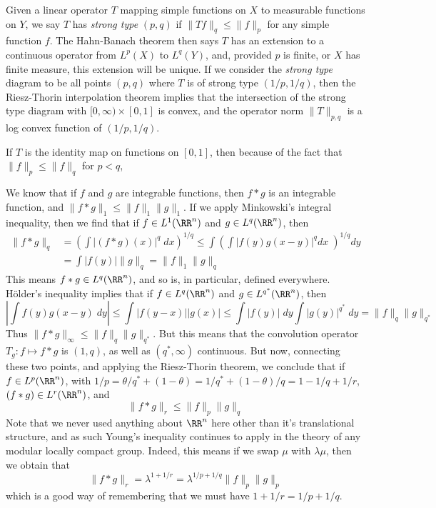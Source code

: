 Given a linear operator $T$ mapping simple functions on $X$ to measurable functions on $Y$, we say $T$ has {\it strong type} $(p,q)$ if $\| T f \|_q \leq \| f \|_p$ for any simple function $f$. The Hahn-Banach theorem then says $T$ has an extension to a continuous operator from $L^p(X)$ to $L^q(Y)$, and, provided $p$ is finite, or $X$ has finite measure, this extension will be unique. If we consider the {\it strong type} diagram to be all points $(p,q)$ where $T$ is of strong type $(1/p,1/q)$, then the Riesz-Thorin interpolation theorem implies that the intersection of the strong type diagram with $[0,\infty) \times [0,1]$ is convex, and the operator norm $\| T \|_{p,q}$ is a log convex function of $(1/p,1/q)$.

\begin{example}
	If $T$ is the identity map on functions on $[0,1]$, then because of the fact that $\| f \|_p \leq \| f \|_q$ for $p < q$,
\end{example}

\begin{example}
	We know that if $f$ and $g$ are integrable functions, then $f * g$ is an integrable function, and $\| f * g \|_1 \leq \| f \|_1 \| g \|_1$. If we apply Minkowski's integral inequality, then we find that if $f \in L^1(\RR^n)$ and $g \in L^q(\RR^n)$, then
	\begin{align*}
		\| f * g \|_q &= \left( \int |(f * g)(x)|^q\; dx \right)^{1/q} \leq \int \left( \int |f(y)g(x-y)|^q dx\; \right)^{1/q} dy\\
		&= \int |f(y)| \| g \|_q = \| f \|_1 \| g \|_q
	\end{align*}
	This means $f * g \in L^q(\RR^n)$, and so is, in particular, defined everywhere. H\"{older}'s inequality implies that if $f \in L^q(\RR^n)$ and $g \in L^{q^*}(\RR^n)$, then
	\[ \left| \int f(y) g(x-y)\; dy \right| \leq \int |f(y-x)| |g(x)| \leq \int |f(y)|\; dy \int |g(y)|^{q^*}\; dy = \| f \|_q \| g \|_{q^*} \]
	Thus $\| f * g \|_\infty \leq \| f \|_q \| g \|_{q^*}$. But this means that the convolution operator $T_g: f \mapsto f * g$ is $(1,q)$, as well as $(q^*,\infty)$ continuous. But now, connecting these two points, and applying the Riesz-Thorin theorem, we conclude that if $f \in L^p(\RR^n)$, with $1/p = \theta/q^* + (1 - \theta) = 1/q^* + (1-\theta)/q = 1 - 1/q + 1/r$, $(f * g) \in L^r(\RR^n)$, and
	\[ \| f * g \|_r \leq \| f \|_p \| g \|_q \]
	Note that we never used anything about $\RR^n$ here other than it's translational structure, and as such Young's inequality continues to apply in the theory of any modular locally compact group. Indeed, this means if we swap $\mu$ with $\lambda \mu$, then we obtain that
	\[ \| f * g \|_r = \lambda^{1 + 1/r} = \lambda^{1/p + 1/q} \| f \|_p \| g \|_p \]
	which is a good way of remembering that we must have $1 + 1/r = 1/p + 1/q$.	
\end{example}

